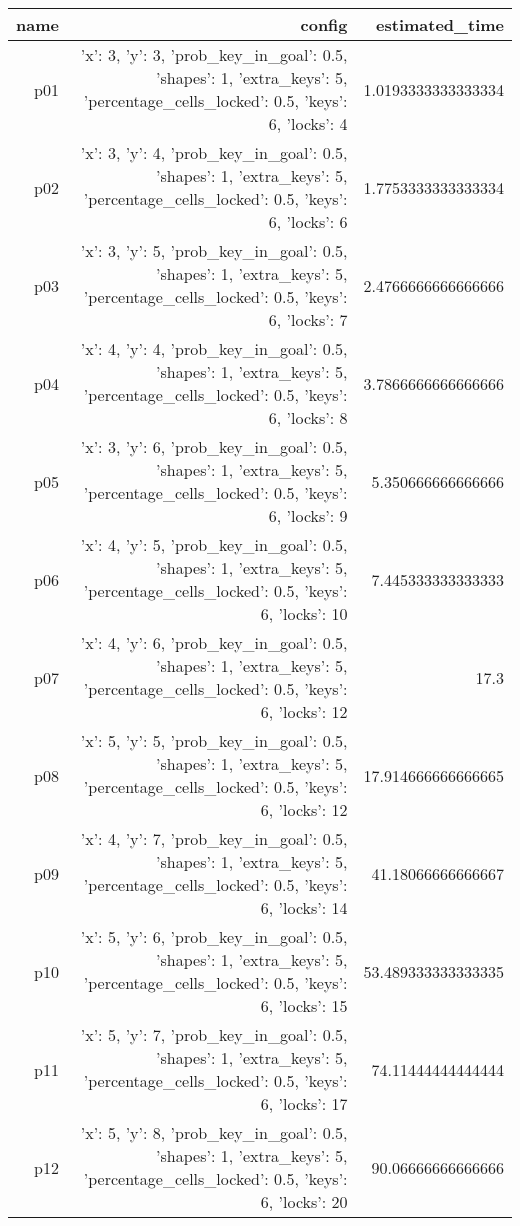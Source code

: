 \documentclass{article}
\begin{document}
                            \begin{center}
                            \scriptsize
                            \begin{tabular}{r|r|r}
                            name & config & estimated\_time\\\midrule
                              p01&{'x': 3, 'y': 3, 'prob\_key\_in\_goal': 0.5, 'shapes': 1, 'extra\_keys': 5, 'percentage\_cells\_locked': 0.5, 'keys': 6, 'locks': 4}&1.0193333333333334\\
  p02&{'x': 3, 'y': 4, 'prob\_key\_in\_goal': 0.5, 'shapes': 1, 'extra\_keys': 5, 'percentage\_cells\_locked': 0.5, 'keys': 6, 'locks': 6}&1.7753333333333334\\
  p03&{'x': 3, 'y': 5, 'prob\_key\_in\_goal': 0.5, 'shapes': 1, 'extra\_keys': 5, 'percentage\_cells\_locked': 0.5, 'keys': 6, 'locks': 7}&2.4766666666666666\\
  p04&{'x': 4, 'y': 4, 'prob\_key\_in\_goal': 0.5, 'shapes': 1, 'extra\_keys': 5, 'percentage\_cells\_locked': 0.5, 'keys': 6, 'locks': 8}&3.7866666666666666\\
  p05&{'x': 3, 'y': 6, 'prob\_key\_in\_goal': 0.5, 'shapes': 1, 'extra\_keys': 5, 'percentage\_cells\_locked': 0.5, 'keys': 6, 'locks': 9}&5.350666666666666\\
  p06&{'x': 4, 'y': 5, 'prob\_key\_in\_goal': 0.5, 'shapes': 1, 'extra\_keys': 5, 'percentage\_cells\_locked': 0.5, 'keys': 6, 'locks': 10}&7.445333333333333\\
  p07&{'x': 4, 'y': 6, 'prob\_key\_in\_goal': 0.5, 'shapes': 1, 'extra\_keys': 5, 'percentage\_cells\_locked': 0.5, 'keys': 6, 'locks': 12}&17.3\\
  p08&{'x': 5, 'y': 5, 'prob\_key\_in\_goal': 0.5, 'shapes': 1, 'extra\_keys': 5, 'percentage\_cells\_locked': 0.5, 'keys': 6, 'locks': 12}&17.914666666666665\\
  p09&{'x': 4, 'y': 7, 'prob\_key\_in\_goal': 0.5, 'shapes': 1, 'extra\_keys': 5, 'percentage\_cells\_locked': 0.5, 'keys': 6, 'locks': 14}&41.18066666666667\\
  p10&{'x': 5, 'y': 6, 'prob\_key\_in\_goal': 0.5, 'shapes': 1, 'extra\_keys': 5, 'percentage\_cells\_locked': 0.5, 'keys': 6, 'locks': 15}&53.489333333333335\\
  p11&{'x': 5, 'y': 7, 'prob\_key\_in\_goal': 0.5, 'shapes': 1, 'extra\_keys': 5, 'percentage\_cells\_locked': 0.5, 'keys': 6, 'locks': 17}&74.11444444444444\\
  p12&{'x': 5, 'y': 8, 'prob\_key\_in\_goal': 0.5, 'shapes': 1, 'extra\_keys': 5, 'percentage\_cells\_locked': 0.5, 'keys': 6, 'locks': 20}&90.06666666666666\\

\end{tabular}
\end{center}
\end{document}
